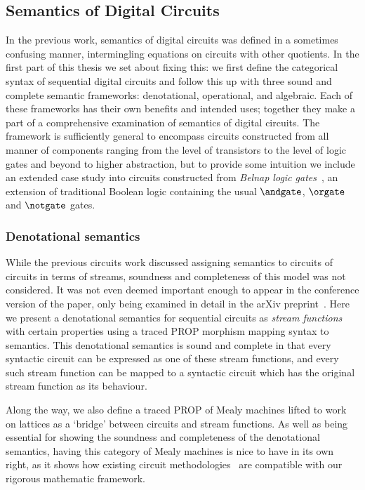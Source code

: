 \subsection{Semantics of Digital Circuits}

In the previous work, semantics of digital circuits was defined in a sometimes
confusing manner, intermingling equations on circuits with other quotients.
In the first part of this thesis we set about fixing this: we first define the
categorical syntax of sequential digital circuits and follow this up with three
sound and complete semantic frameworks: denotational, operational, and
algebraic.
Each of these frameworks has their own benefits and intended uses; together they
make a part of a comprehensive examination of semantics of digital circuits.
The framework is sufficiently general to encompass circuits constructed from
all manner of components ranging from the level of transistors to the level of
logic gates and beyond to higher abstraction, but to provide some intuition we
include an extended case study into circuits constructed from
\emph{Belnap logic gates}~\cite{belnap1977useful}, an extension of traditional
Boolean logic containing the usual \(\andgate\), \(\orgate\) and \(\notgate\)
gates.

\subsubsection{Denotational semantics}

While the previous circuits work discussed assigning semantics to circuits
of circuits in terms of streams, soundness and completeness of this model was
not considered.
It was not even deemed important enough to appear in the conference version of
the paper, only being examined in detail in the arXiv
preprint~\cite{ghica2017diagrammatica}.
Here we present a denotational semantics for sequential circuits as
\emph{stream functions} with certain properties using a traced PROP morphism
mapping syntax to semantics.
This denotational semantics is sound and complete in that every syntactic
circuit can be expressed as one of these stream functions, and every such stream
function can be mapped to a syntactic circuit which has the original stream
function as its behaviour.

Along the way, we also define a traced PROP of Mealy machines lifted to work on
lattices as a `bridge' between circuits and stream functions.
As well as being essential for showing the soundness and completeness of the
denotational semantics, having this category of Mealy machines is nice to have
in its own right, as it shows how existing circuit
methodologies~\cite{kohavi2009switching} are compatible with our rigorous
mathematic framework.

